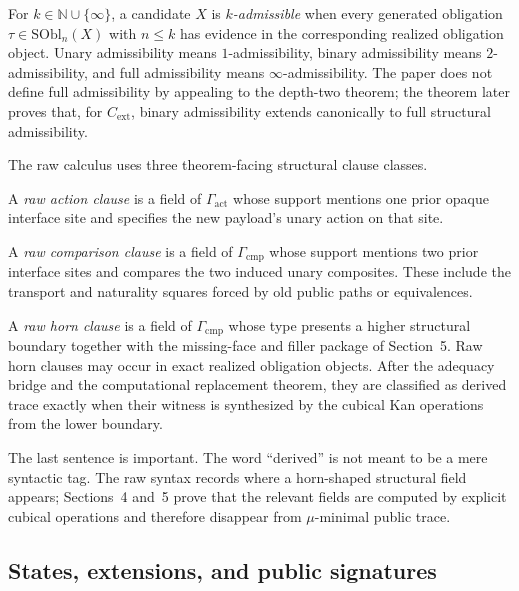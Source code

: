 \documentclass{lmcs}
\newcommand{\SObl}{\mathrm{SObl}}
\newcommand{\Cext}{C_{\mathrm{ext}}}
\begin{document}
\begin{defi}
\label{def:depth-indexed-admissibility}
For \(k\in\mathbb N\cup\{\infty\}\), a candidate \(X\) is
\emph{\(k\)-admissible} when every generated obligation
\(\tau\in\SObl_n(X)\) with \(n\leq k\) has evidence in the corresponding
realized obligation object.  Unary admissibility means \(1\)-admissibility,
binary admissibility means \(2\)-admissibility, and full admissibility means
\(\infty\)-admissibility.  The paper does not define full admissibility by
appealing to the depth-two theorem; the theorem later proves that, for
\(\Cext\), binary admissibility extends canonically to full structural
admissibility.
\end{defi}

\begin{defi}
The raw calculus uses three theorem-facing structural clause classes.

A \emph{raw action clause} is a field of \(\Gamma_{\mathrm{act}}\) whose support mentions one
prior opaque interface site and specifies the new payload's unary action on that site.

A \emph{raw comparison clause} is a field of \(\Gamma_{\mathrm{cmp}}\) whose support mentions
two prior interface sites and compares the two induced unary composites.  These include the
transport and naturality squares forced by old public paths or equivalences.

A \emph{raw horn clause} is a field of \(\Gamma_{\mathrm{cmp}}\) whose type presents a higher
structural boundary together with the missing-face and filler package of Section~5.  Raw horn
clauses may occur in exact realized obligation objects.  After the adequacy bridge and the
computational replacement theorem, they are classified as derived trace exactly when their
witness is synthesized by the cubical Kan operations from the lower boundary.
\end{defi}

The last sentence is important.  The word ``derived'' is not meant to be a mere syntactic tag.
The raw syntax records where a horn-shaped structural field appears; Sections~4 and~5 prove
that the relevant fields are computed by explicit cubical operations and therefore disappear
from \(\mu\)-minimal public trace.

\subsection{States, extensions, and public signatures}
\end{document}
